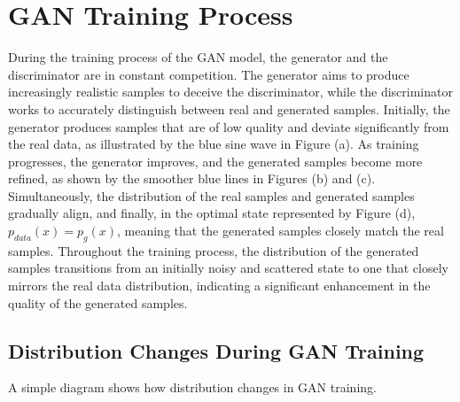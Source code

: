 \section{GAN Training Process}

During the training process of the GAN model, the generator and the discriminator are in constant competition. 
The generator aims to produce increasingly realistic samples to deceive the discriminator, while the discriminator 
works to accurately distinguish between real and generated samples. Initially, the generator produces samples 
that are of low quality and deviate significantly from the real data, as illustrated by the blue sine wave in 
Figure (a). As training progresses, the generator improves, and the generated samples become more refined, 
as shown by the smoother blue lines in Figures (b) and (c). Simultaneously, the distribution of the real samples 
and generated samples gradually align, and finally, in the optimal state represented by Figure (d), 
$p_{data}(x) = p_g(x)$, meaning that the generated samples closely match the real samples. Throughout the 
training process, the distribution of the generated samples transitions from an initially noisy and scattered state 
to one that closely mirrors the real data distribution, indicating a significant enhancement in the quality 
of the generated samples.

\subsection{Distribution Changes During GAN Training}
A simple diagram shows how distribution changes in GAN training.


